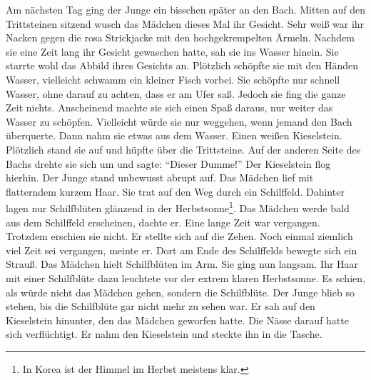 \documentclass[prd,12pt,tightenlines,notitlepage,nofootinbib]{revtex4-1}
\begin{document}
Am nächsten Tag ging der Junge ein bisschen später an den Bach.
Mitten auf den Trittsteinen sitzend wusch das Mädchen dieses Mal ihr
Gesicht.  Sehr weiß war ihr Nacken gegen die rosa
Strickjacke mit den hochgekrempelten Ärmeln.  Nachdem sie eine Zeit lang
ihr Gesicht gewaschen hatte, sah sie ins Wasser hinein.  Sie starrte wohl das
Abbild ihres Gesichts an.  Plötzlich schöpfte sie mit den Händen
Wasser, vielleicht schwamm ein kleiner Fisch vorbei.  Sie schöpfte nur schnell
Wasser, ohne darauf zu achten, dass er am Ufer saß.  Jedoch sie fing
die ganze Zeit nichts.  Anscheinend machte sie sich einen Spaß daraus,
nur weiter das Wasser zu schöpfen.  Vielleicht würde sie nur weggehen,
wenn jemand den Bach überquerte.  Dann nahm sie etwas aus dem Wasser.
Einen weißen Kieselstein.  Plötzlich stand sie auf und hüpfte über die
Trittsteine.  Auf der anderen Seite des Bachs drehte sie sich um und
sagte: "`Dieser Dumme!"'  Der Kieselstein flog hierhin.  Der Junge stand
unbewusst abrupt auf.  Das Mädchen lief mit flatterndem kurzem
Haar.  Sie trat auf den Weg durch ein Schilffeld.  Dahinter lagen nur
Schilfblüten glänzend in der Herbstsonne\footnote{In Korea ist
der Himmel im Herbst meistens klar.}.
Das Mädchen werde bald aus dem
Schilffeld erscheinen, dachte er.  Eine lange Zeit war vergangen.
Trotzdem erschien sie nicht.  Er stellte sich auf die Zehen.  Noch einmal
ziemlich viel Zeit sei vergangen, meinte er.  Dort am Ende des
Schilffelds bewegte sich ein Strauß.  Das Mädchen hielt Schilfblüten
im Arm.  Sie ging nun langsam.  Ihr Haar mit einer Schilfblüte dazu
leuchtete vor der extrem klaren Herbstsonne.  Es schien, als würde
nicht das Mädchen gehen, sondern die Schilfblüte.  Der Junge blieb
so stehen, bis die Schilfblüte gar nicht mehr zu sehen war.  Er sah
auf den Kieselstein hinunter, den das Mädchen geworfen hatte.  Die Nässe darauf
hatte sich verflüchtigt.  Er nahm den Kieselstein und steckte ihn in die
Tasche.
\end{document}

